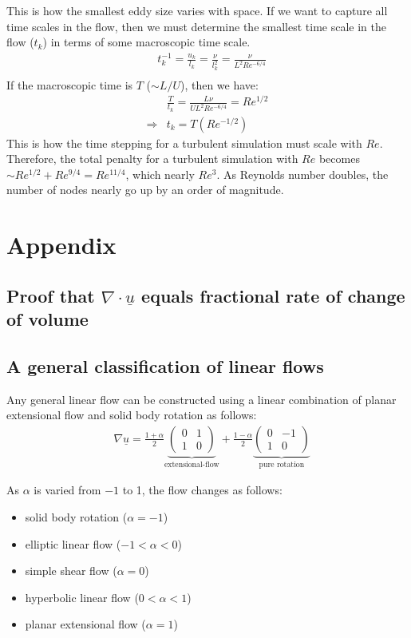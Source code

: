 \documentclass[11pt,a4paper]{article}
\newcommand{\describe}[2]{\underbrace{#2}_{\text{#1}}}%
\newcommand{\vv}[1]{\underline{#1}}
\newcommand{\1}{\vect{1}}
\newcommand{\grad}{\nabla}
\newcommand{\RA}{\Rightarrow}
\begin{document}
This is how the smallest eddy size varies with space. If we want to capture all time scales in the flow, then we must determine the smallest time scale in the flow ($t_k$) in terms of some macroscopic time scale.
\begin{align*}
&t_k^{-1} = \frac{u_k}{l_k} = \frac{\nu}{l_k^2} =\frac{\nu}{L^2 Re^{-6/4}} \\ 
\end{align*}
If the macroscopic time is $T$ ($\sim L/U$), then we have:
\begin{align*}
&\frac{T}{t_k} = \frac{L \nu}{U L^2 Re^{-6/4}} = Re^{1/2}\\
\RA& t_k = T (Re^{-1/2})
\end{align*}
This is how the time stepping for a turbulent simulation must scale with $Re$. Therefore, the total penalty for a turbulent simulation with $Re$ becomes $\sim Re^{1/2} + Re^{9/4} = Re^{11/4}$, which nearly $Re^3$. As Reynolds number doubles, the number of nodes nearly go up by an order of magnitude.


\section{Appendix}

\subsection{Proof that $\grad\cdot \vv u$ equals fractional rate of change of volume}

\subsection{A general classification of linear flows}

Any general linear flow can be constructed using a linear combination of planar extensional flow and solid body rotation as follows:
\begin{align*}
&\grad \vv u  = \frac{1+\alpha}{2}\describe{extensional-flow}{\begin{pmatrix}
0 & 1\\
1 & 0
\end{pmatrix}}
+\frac{1-\alpha}{2}\describe{pure rotation}{\begin{pmatrix}
0 & -1\\
1 & 0
\end{pmatrix}}
\end{align*}

As $\alpha$ is varied from $-1$ to 1, the flow changes as follows: 
\begin{itemize}
\item solid body rotation ($\alpha = -1$)
\item elliptic linear flow ($ -1<\alpha <0$)
\item simple shear flow ($ \alpha = 0$)
\item hyperbolic linear flow ($ 0<\alpha <1$)
\item planar extensional flow ($ \alpha = 1$)
\end{itemize}
\end{document}
